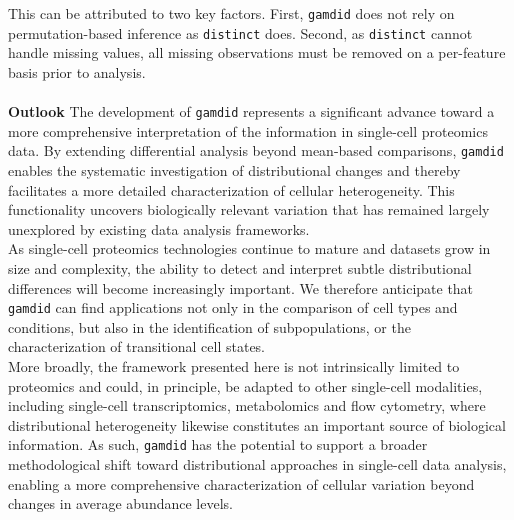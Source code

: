 This can be attributed to two key factors. First, \texttt{gamdid} does not rely on permutation-based inference as \texttt{distinct} does. Second, as \texttt{distinct} cannot handle missing values, all missing observations must be removed on a per-feature basis prior to analysis.
\\
\\
\textbf{Outlook}
The development of \texttt{gamdid} represents a significant advance toward a more comprehensive interpretation of the information in single-cell proteomics data. By extending differential analysis beyond mean-based comparisons, \texttt{gamdid} enables the systematic investigation of distributional changes and thereby facilitates a more detailed characterization of cellular heterogeneity. This functionality uncovers biologically relevant variation that has remained largely unexplored by existing data analysis frameworks.\\
As single-cell proteomics technologies continue to mature and datasets grow in size and complexity, the ability to detect and interpret subtle distributional differences will become increasingly important. We therefore anticipate that \texttt{gamdid} can find applications not only in the comparison of cell types and conditions, but also in the identification of subpopulations, or the characterization of transitional cell states.\\
More broadly, the framework presented here is not intrinsically limited to proteomics and could, in principle, be adapted to other single-cell modalities, including single-cell transcriptomics, metabolomics and flow cytometry, where distributional heterogeneity likewise constitutes an important source of biological information. As such, \texttt{gamdid} has the potential to support a broader methodological shift toward distributional approaches in single-cell data analysis, enabling a more comprehensive characterization of cellular variation beyond changes in average abundance levels.




